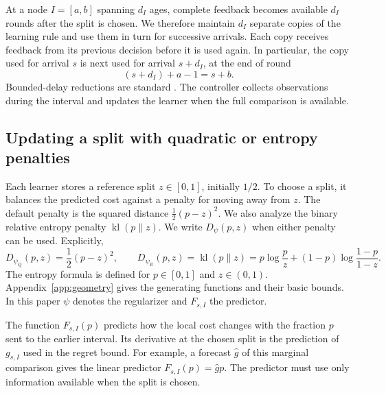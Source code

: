 \documentclass[11pt]{article}
\theoremstyle{plain}
\theoremstyle{remark}
\numberwithin{equation}{section}
\begin{document}
At a node $I=[a,b]$ spanning $d_I$ ages, complete feedback becomes
available $d_I$ rounds after the split is chosen. We therefore maintain
$d_I$ separate copies of the learning rule and use them in turn for
successive arrivals. Each copy receives feedback from its previous
decision before it is used again. In particular, the copy used for
arrival $s$ is next used for arrival $s+d_I$, at the end of round
\begin{equation}\label{ch6:eq:timing}
 (s+d_I)+a-1=s+b.
\end{equation}
Bounded-delay reductions are standard \cite{joulani2013delayed}.
The controller collects observations
during the interval and updates the learner when the full comparison is available.

\subsection{Updating a split with quadratic or entropy penalties}
Each learner stores a reference split $z\in[0,1]$, initially $1/2$.
To choose a split, it balances the predicted cost against a penalty for
moving away from $z$. The default penalty is the squared distance
$\tfrac12(p-z)^2$. We also analyze the binary relative entropy penalty
$\operatorname{kl}(p\|z)$. We write $D_\psi(p,z)$ when either penalty can
be used.
Explicitly,
\[
 D_{\psi_Q}(p,z)=\frac12(p-z)^2,\qquad
 D_{\psi_E}(p,z)=\operatorname{kl}(p\|z)
 =p\log\frac pz+(1-p)\log\frac{1-p}{1-z}.
\]
The entropy formula is defined for $p\in[0,1]$ and $z\in(0,1)$.
Appendix~\ref{app:geometry} gives the generating functions and their
basic bounds.
In this paper $\psi$ denotes the regularizer and $F_{s,I}$ the predictor.

The function $F_{s,I}(p)$ predicts how the local cost changes with the
fraction $p$ sent to the earlier interval. Its derivative at the chosen
split is the prediction of $g_{s,I}$ used in the regret bound. For example,
a forecast $\widehat g$ of this marginal comparison gives the linear
predictor $F_{s,I}(p)=\widehat g p$. The predictor must use only information
available when the split is chosen.
\end{document}
